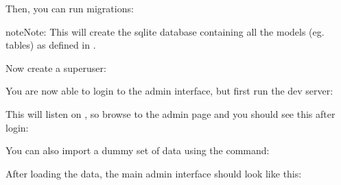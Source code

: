 \documentclass[letterpaper,10pt,openany,oneside,english]{sphinxmanual}
\begin{document}
Then, you can run migrations:

%
\begin{sphinxVerbatim}[commandchars=\\\{\}]
  
\end{sphinxVerbatim}

\begin{sphinxadmonition}{note}{Note:}
This will create the sqlite database  containing all the models
(eg. tables) as defined in {\hyperref[\detokenize{index:module-animals.models}]{}}.
\end{sphinxadmonition}

Now create a superuser:

%
\begin{sphinxVerbatim}[commandchars=\\\{\}]
  
\end{sphinxVerbatim}

You are now able to login to the admin interface, but first run the dev server:

%
\begin{sphinxVerbatim}[commandchars=\\\{\}]
  
\end{sphinxVerbatim}

This will listen on , so browse to the admin page
 and you should see this after login:

\noindent{}

You can also import a dummy set of data using the  command:

%
\begin{sphinxVerbatim}[commandchars=\\\{\}]
   
\end{sphinxVerbatim}

After loading the data, the main admin interface should look like this:
\end{document}
